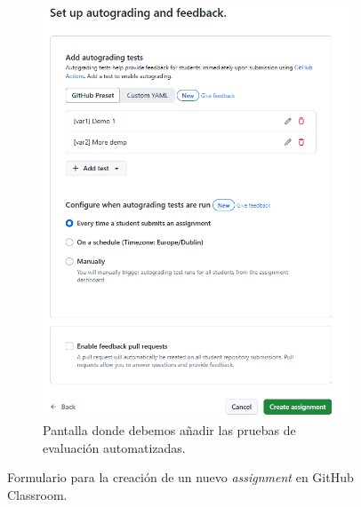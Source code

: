 \begin{figure}
\begin{subfigure}{0.24\textwidth}
       \includegraphics[width=1\linewidth]{images/ghc-new-assig-3.png}
        \caption{Pantalla donde debemos añadir las pruebas de evaluación automatizadas.}
        \label{fig:ghc-new-assig-3}
    \end{subfigure}
    \caption{Formulario para la creación de un nuevo \textit{assignment} en GitHub Classroom.}
\end{figure}


